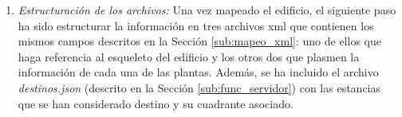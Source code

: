 \begin{enumerate}
	\item \textit{Estructuración de los archivos:} Una vez mapeado el edificio, el siguiente paso ha sido estructurar la información en tres archivos xml que contienen los mismos campos descritos en la Sección \ref{sub:mapeo_xml}: uno de ellos que haga referencia al esqueleto del edificio y los otros dos que plasmen la información de cada una de las plantas. Además, se ha incluido el archivo \textit{destinos.json} (descrito en la Sección \ref{sub:func_servidor}) con las estancias que se han considerado destino y su cuadrante asociado.%
\end{enumerate}


%
%
